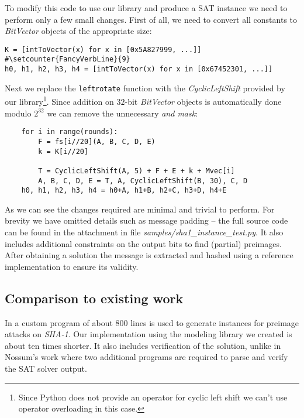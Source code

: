 To modify this code to use our library and produce a SAT instance we need to perform only a few small changes.
First of all, we need to convert all constants to \emph{BitVector} objects of the appropriate size:
\pagebreak
\begin{verbatim}
K = [intToVector(x) for x in [0x5A827999, ...]]                                 #\setcounter{FancyVerbLine}{9}
h0, h1, h2, h3, h4 = [intToVector(x) for x in [0x67452301, ...]]
\end{verbatim}

Next we replace the \texttt{leftrotate} function with the \emph{CyclicLeftShift} provided by our library\footnote{Since Python does not provide an operator for cyclic left shift we can't use operator overloading in this case.}.
Since addition on $32$-bit \emph{BitVector} objects is automatically done modulo $2^{32}$ we can remove the unnecessary \emph{and mask}:
\begin{verbatim}
    for i in range(rounds):
        F = fs[i//20](A, B, C, D, E)
        k = K[i//20]

        T = CyclicLeftShift(A, 5) + F + E + k + Mvec[i]
        A, B, C, D, E = T, A, CyclicLeftShift(B, 30), C, D
    h0, h1, h2, h3, h4 = h0+A, h1+B, h2+C, h3+D, h4+E
\end{verbatim}

As we can see the changes required are minimal and trivial to perform.
For brevity we have omitted details such as message padding -- the full source code can be found in the attachment \cite{papay2016code} in file \emph{samples/sha1\_instance\_test.py}.
It also includes additional constraints on the output bits to find (partial) preimages.
After obtaining a solution the message is extracted and hashed using a reference implementation to ensure its validity.

\subsection{Comparison to existing work}
In \cite{nossum2012sat} a custom program of about $800$ lines is used to generate instances for preimage attacks on \emph{SHA-1}.
Our implementation using the modeling library we created is about ten times shorter.
It also includes verification of the solution, unlike in Nossum's work where two additional programs are required to parse and verify the SAT solver output.

